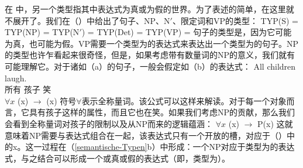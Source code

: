 在 中，另一个类型指其中表达式为真或为假的世界。为了表述的简单，在这里就不展开了。我们在（）中给出了句子、NP、N$'$、限定词和VP的类型：
\eal
\label{semantische-Typen}
\ex TYP(S)   = 
\ex TYP(NP)  = 
\ex TYP(N$'$)  = 
\ex TYP(Det) = 
\ex TYP(VP)  = 
\zl
句子的类型是，因为它可能为真，也可能为假。VP需要一个类型为的表达式来表达出一个类型为的句子。NP的类型也许乍看起来很奇怪，但是，如果考虑带有数量词的NP的意义，我们就有可能理解它。对于诸如（a）的句子，一般会假定如（b）的表达式：
\eal
\ex 
\gll All children laugh.\\
所有 孩子 笑\\
\ex $\forall x$ (x) $\to$ (x)
\zl
符号$\forall$表示全称量词。该公式可以这样来解读。对于每一个对象而言，它具有孩子这样的属性，而且它也在笑。如果我们考虑NP的贡献，那么我们会看到全称量词对孩子的限制以及从NP而来的逻辑蕴涵：
\ea
$\forall x$ (x) $\to$ P(x)
\z
这就意味着NP需要与表达式组合在一起，该表达式只有一个开放的槽，对应于（）中的x。这一过程在（\ref{semantische-Typen}b）中形成：一个NP对应于类型为的表达式，与之结合可以形成一个或真或假的表达式（即，类型为）。

